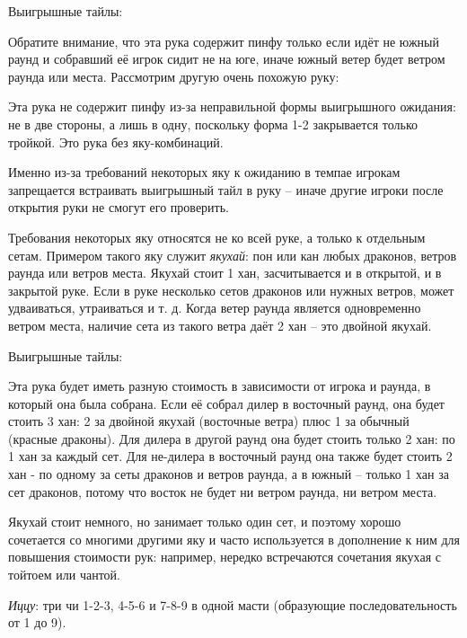 
Выигрышные тайлы: 

Обратите внимание, что эта рука содержит пинфу только если идёт не южный раунд и собравший её игрок сидит не на юге, иначе южный ветер будет ветром раунда или места. Рассмотрим другую очень похожую руку:


Эта рука не содержит пинфу из-за неправильной формы выигрышного ожидания: не в две стороны, а лишь в одну, поскольку форма 1-2 закрывается только тройкой. Это рука без яку-комбинаций.

Именно из-за требований некоторых яку к ожиданию в темпае игрокам запрещается встраивать выигрышный тайл в руку – иначе другие игроки после открытия руки не смогут его проверить. 

Требования некоторых яку относятся не ко всей руке, а только к отдельным сетам. Примером такого яку служит \textit{якухай}: пон или кан любых драконов, ветров раунда или ветров места. Якухай стоит 1 хан, засчитывается и в открытой, и в закрытой руке. Если в руке несколько сетов драконов или нужных ветров, может удваиваться, утраиваться и т. д. Когда ветер раунда является одновременно ветром места, наличие сета из такого ветра даёт 2 хан – это двойной якухай.

\hfill {}

Выигрышные тайлы: 

Эта рука будет иметь разную стоимость в зависимости от игрока и раунда, в который она была собрана. Если её собрал дилер в восточный раунд, она будет стоить 3 хан: 2 за двойной якухай (восточные ветра) плюс 1 за обычный (красные драконы). Для дилера в другой раунд она будет стоить только 2 хан: по 1 хан за каждый сет. Для не-дилера в восточный раунд она также будет стоить 2 хан - по одному за сеты драконов и ветров раунда, а в южный – только 1 хан за сет драконов, потому что восток не будет ни ветром раунда, ни ветром места.

Якухай стоит немного, но занимает только один сет, и поэтому хорошо сочетается со многими другими яку и часто используется в дополнение к ним для повышения стоимости рук: например, нередко встречаются сочетания якухая с тойтоем или чантой.

\textit{Иццу}: три чи 1-2-3, 4-5-6 и 7-8-9 в одной масти (образующие последовательность от 1 до 9).


